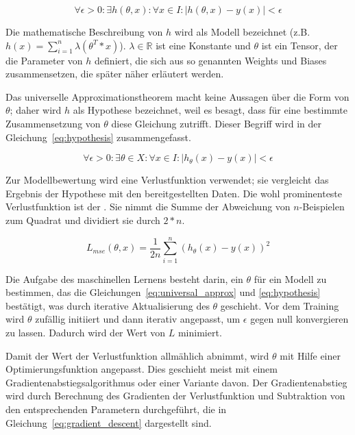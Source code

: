\begin{equation}
    \forall \epsilon > 0 :
    \exists h(\theta, x) : \forall x \in I : | h(\theta, x) - y(x) | < \epsilon
    \label{eq:universal_approx}
\end{equation}

Die mathematische Beschreibung von $h$ wird als Modell bezeichnet (z.B. $h(x) = \sum_{i=1}^n{\lambda (\theta^T * x)}$).
$\lambda \in \mathbb{R}$ ist eine Konstante und $\theta$ ist ein Tensor, der die Parameter von $h$ definiert, die sich aus so genannten Weights und Biases zusammensetzen, die später näher erläutert werden.

Das universelle Approximationstheorem macht keine Aussagen über die Form von $\theta$; daher wird $h$ als Hypothese bezeichnet, weil es besagt, dass für eine bestimmte Zusammensetzung von $\theta$ diese Gleichung zutrifft.
Dieser Begriff wird in der Gleichung~\eqref{eq:hypothesis} zusammengefasst.

\begin{equation}
    \forall \epsilon > 0 : \exists \theta \in X : \forall x \in I : |
    h_\theta(x) - y(x) | < \epsilon
    \label{eq:hypothesis}
\end{equation}

Zur Modellbewertung wird eine Verlustfunktion verwendet; sie vergleicht das Ergebnis der Hypothese mit den bereitgestellten Daten.
Die wohl prominenteste Verlustfunktion ist der .
Sie nimmt die Summe der Abweichung von $n$-Beispielen zum Quadrat und dividiert sie durch $2*n$.

\begin{equation}
    L_{mse}(\theta, x) = \frac{1}{2 n} \sum_{i=1}^n (h_\theta(x) - y(x))^2
    \label{eq:mse}
\end{equation}

Die Aufgabe des maschinellen Lernens besteht darin, ein $\theta$ für ein Modell zu bestimmen, das die Gleichungen~\ref{eq:universal_approx} und \ref{eq:hypothesis} bestätigt, was durch iterative Aktualisierung des $\theta$ geschieht. 
Vor dem Training wird $\theta$ zufällig initiiert und dann iterativ angepasst, um $\epsilon$ gegen null konvergieren zu lassen. Dadurch wird der Wert von $L$ minimiert.

Damit der Wert der Verlustfunktion allmählich abnimmt, wird $\theta$ mit Hilfe einer Optimierungsfunktion angepasst.
Dies geschieht meist mit einem Gradientenabstiegsalgorithmus oder einer Variante davon.
Der Gradientenabstieg wird durch Berechnung des Gradienten der Verlustfunktion und Subtraktion von den entsprechenden Parametern durchgeführt, die in  Gleichung~\eqref{eq:gradient_descent} dargestellt sind.

